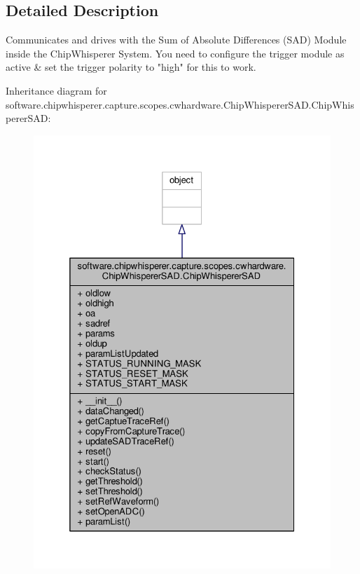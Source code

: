 \subsection{Detailed Description}
\begin{DoxyVerb}Communicates and drives with the Sum of Absolute Differences (SAD) Module inside the ChipWhisperer System. You
need to configure the trigger module as active & set the trigger polarity to "high" for this to work.    
\end{DoxyVerb}
 

Inheritance diagram for software.\+chipwhisperer.\+capture.\+scopes.\+cwhardware.\+Chip\+Whisperer\+S\+A\+D.\+Chip\+Whisperer\+S\+A\+D\+:\nopagebreak
\begin{figure}[H]
\begin{center}
\leavevmode
\includegraphics[width=325pt]{d6/dc5/classsoftware_1_1chipwhisperer_1_1capture_1_1scopes_1_1cwhardware_1_1ChipWhispererSAD_1_1ChipWhispererSAD__inherit__graph}
\end{center}
\end{figure}


